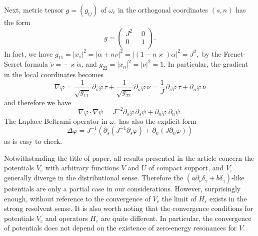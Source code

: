 \documentclass[graybox]{svmult}
\renewcommand{\kappa}{\varkappa}
\newcommand{\eps}{\varepsilon}
\renewcommand{\phi}{\varphi}
\begin{document}
Next, metric tensor $g=(g_{ij})$ of $\omega_\eps$ in the orthogonal coordinates $(s,n)$  has the form
$$
    g=\left(
        \begin{array}{cc}
          J^2\phantom{0} & 0 \\
          0\phantom{0} & 1\\
        \end{array}
      \right).
$$
In fact, we have
$
g_{11}=|x_s|^2=|\dot{\alpha}+n \dot{\nu}|^2
=|(1-n\kappa) \dot{\alpha}|^2=J^2,
$
by the Frenet-Serret formula $\dot{\nu}=-\kappa \dot{\alpha}$, and $g_{22}=|x_n|^2=|\nu|^2=1$.
In particular,  the gradient in the local coordinates becomes
$$
 \nabla \phi=\frac1{\sqrt{g_{11}}}\,\partial_s\phi\, \tau+\frac1{\sqrt{g_{22}}}\,\partial_n\phi\, \nu=\frac1J\,\partial_s\phi\, \tau+\partial_n\phi\, \nu
$$
and  therefore we have
\begin{equation}\label{ScalarProdGrads}
  \nabla \phi\cdot \nabla \psi=J^{-2}\partial_s\phi\, \partial_s \psi+
\partial_n \phi\; \partial_n \psi.
\end{equation}
The Laplace-Beltrami operator in $\omega_\eps$ has also the explicit form
\begin{equation}\label{LaplacianInSN}
\Delta \phi=J^{-1}\left(\partial_s(J^{-1}\partial_s \phi)+ \partial_n(J\partial_n \phi)\right)
\end{equation}
as is easy to check.

Notwithstanding the title of paper, all results presented in the article concern the potentials $V_\eps$ with arbitrary functions $V$ and $U$ of compact support, and $V_\eps$ generally diverge in the distributional sense. Therefore
the $(a \partial_\nu\delta_\gamma+b\delta_\gamma)$-like potentials are only a partial case in our considerations. However,
surprisingly enough, without reference to the convergence of $V_\eps$  the limit of $H_\eps$ exists in the strong resolvent sense. It is also worth noting that the convergence conditions for potentials $V_\eps$ and operators $H_\eps$ are quite different. In particular, the convergence of potentials does not depend on the existence of zero-energy resonances for $V$.
\end{document}
